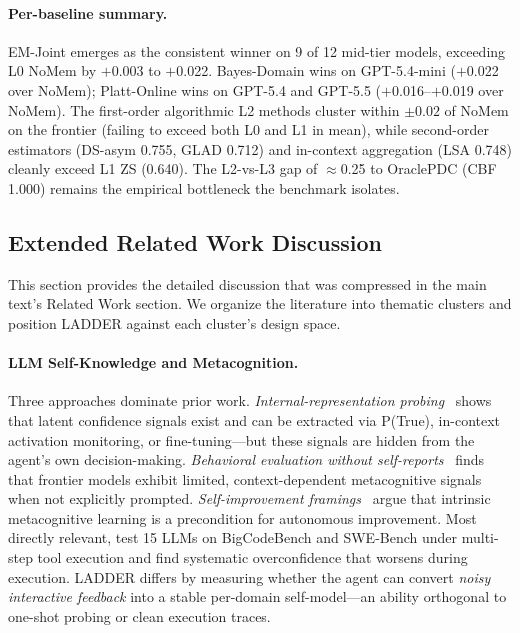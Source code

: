 \documentclass[11pt]{article}
\begin{document}
\paragraph{Per-baseline summary.} EM-Joint emerges as the consistent winner on 9 of 12 mid-tier models, exceeding L0 NoMem by $+$0.003 to $+$0.022. Bayes-Domain wins on GPT-5.4-mini ($+$0.022 over NoMem); Platt-Online wins on GPT-5.4 and GPT-5.5 ($+$0.016--$+$0.019 over NoMem). The first-order algorithmic L2 methods cluster within $\pm 0.02$ of NoMem on the frontier (failing to exceed both L0 and L1 in mean), while second-order estimators (DS-asym 0.755, GLAD 0.712) and in-context aggregation (LSA 0.748) cleanly exceed L1 ZS (0.640). The L2-vs-L3 gap of $\approx$0.25 to OraclePDC (CBF 1.000) remains the empirical bottleneck the benchmark isolates.





\subsection{Extended Related Work Discussion}
\label{app:related_extended}

This section provides the detailed discussion that was compressed in the main text's Related Work section. We organize the literature into thematic clusters and position LADDER against each cluster's design space.

\paragraph{LLM Self-Knowledge and Metacognition.}
Three approaches dominate prior work. \emph{Internal-representation probing}~\citep{kadavath2022language, jian2025metacognition, binder2025introspection} shows that latent confidence signals exist and can be extracted via P(True), in-context activation monitoring, or fine-tuning---but these signals are hidden from the agent's own decision-making. \emph{Behavioral evaluation without self-reports}~\citep{ackerman2026metacognition} finds that frontier models exhibit limited, context-dependent metacognitive signals when not explicitly prompted. \emph{Self-improvement framings}~\citep{liu2025metacognitive_learning} argue that intrinsic metacognitive learning is a precondition for autonomous improvement. Most directly relevant, \citet{barkan2026capable} test 15 LLMs on BigCodeBench and SWE-Bench under multi-step tool execution and find systematic overconfidence that worsens during execution. LADDER differs by measuring whether the agent can convert \emph{noisy interactive feedback} into a stable per-domain self-model---an ability orthogonal to one-shot probing or clean execution traces.
\end{document}
